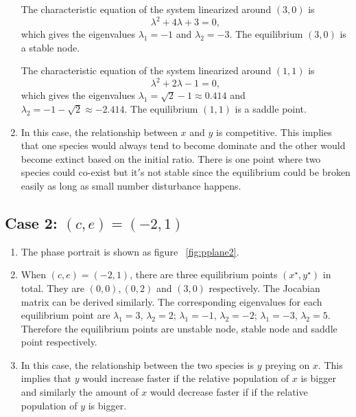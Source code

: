 \begin{enumerate}
The characteristic equation of the system linearized around $(3,0)$ is
$$\lambda^2 +4 \lambda + 3 = 0,$$ which gives the eigenvalues $\lambda_1 = -1$ and $\lambda_2 = -3$. The equilibrium $(3,0)$ is a stable node.

The characteristic equation of the system linearized around $(1,1)$ is $$\lambda^2 +2 \lambda - 1 = 0,$$ which gives the eigenvalues $\lambda_1 = \sqrt{2} -1 \approx 0.414$ and $\lambda_2 = -1 -\sqrt{2} \approx -2.414$. The equilibrium $(1,1)$ is a saddle point.

\item In this case, the relationship between $x$ and $y$ is competitive. This implies that one species would always tend to become dominate and the other would become extinct based on the initial ratio. There is one point where two species could co-exist but it$'$s not stable since the equilibrium could be broken easily as long as small number disturbance happens.  
\end{enumerate}

\subsection*{Case 2: $(c,e)=(-2,1)$}
\begin{enumerate}
\item The phase portrait is shown as figure ~\ref{fig:pplane2}.
\item When $(c,e)=(-2,1)$, there are three equilibrium points $(x^\star,y^\star)$ in total. They are $(0,0),(0,2)$ and $(3,0)$ respectively. The Jocabian matrix can be derived similarly. The corresponding eigenvalues for each equilibrium point are $\lambda_{1} = 3$, $\lambda_{2} = 2$; $\lambda_1 = -1$, $\lambda_2 = -2$; $\lambda_1 = -3$, $\lambda_2 = 5$. Therefore the equilibrium points are unstable node, stable node and saddle point respectively.
\item In this case, the relationship between the two species is $y$ preying on $x$. This implies that $y$ would increase faster if the relative population of $x$ is bigger and similarly the amount of $x$ would decrease faster if if the relative population of $y$ is bigger.
\end{enumerate}

